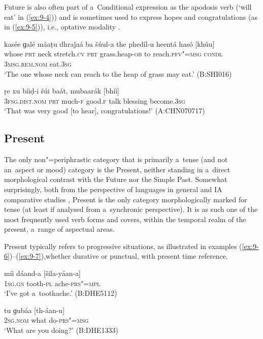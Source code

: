 Future is also often part of a~Conditional expression as the apodosis verb (`will eat' in (\ref{ex:9-4})) and is sometimes used to express hopes and congratulations (as in (\ref{ex:9-5})), i.e., optative modality \citep[179]{bybeeetal1994}.

\begin{exe}
\ex
\label{ex:9-4}
\gll kasée ɡalé máaṭu dhraǰaá ba šúul-a the phedíl-u heentá hasó [khúu] \\
whose \textsc{prt} neck stretch.\textsc{cv} \textsc{prt} grass.heap-\textsc{ob}  to reach.\textsc{pfv"=msg } \textsc{condl} \textsc{3msg.rem.nom} eat.\textsc{3sg} \\
\glt `The one whose neck can reach to the heap of grass may eat.' (B:SHI016)

\ex
\label{ex:9-5}
\gll ṛe xu bíiḍ-i šúi baát, mubaarák [bhíi] \\
\textsc{3fsg.dist.nom} \textsc{prt} much-\textsc{f} good.\textsc{f} talk blessing  become.\textsc{3sg} \\
\glt `That was very good [to hear], congratulations!' (A:CHN070717)
\end{exe}

\subsection{Present}
\label{subsec:9-1-3}

The only non"=periphrastic category that is primarily a~tense (and not an~aspect or mood) category is the Present, neither standing in a~direct morphological contrast with the Future nor the Simple Past. Somewhat surprisingly, both from the perspective of languages in general \citep[103--128]{dahl1985} and IA comparative studies \citep[282, 288--289]{masica1991}, Present is the only category morphologically marked for tense (at least if analysed from a~synchronic perspective). It is as such one of the most frequently used verb forms and covers, within the temporal realm of the present, a~range of aspectual areas. 



Present typically refers to progressive situations, as illustrated in examples (\ref{ex:9-6})--(\ref{ex:9-7}),whether durative or punctual, with present time reference.

\begin{exe}
\ex
\label{ex:9-6}
\gll míi dáand-a [šila-yáan-a] \\
\textsc{1sg.gn} tooth-\textsc{pl} ache-\textsc{prs"=mpl} \\
\glt `I've got a~toothache.' (B:DHE5112)

\ex
\label{ex:9-7}
\gll tu ɡubáa [th-áan-u] \\
\textsc{2sg.nom} what do-\textsc{prs"=msg} \\
\glt `What are you doing?' (B:DHE1333)
\end{exe}

